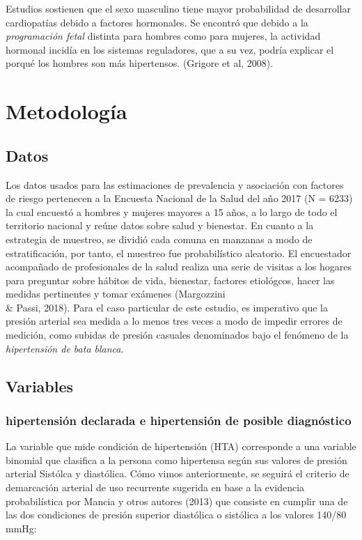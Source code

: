 \documentclass{aa}
\begin{document}
Estudios sostienen que el sexo masculino tiene mayor probabilidad de desarrollar cardiopatías debido a factores hormonales. Se encontró que debido a la \textit{programación fetal} distinta para hombres como para mujeres, la actividad hormonal incidía en los sistemas reguladores, que a su vez, podría explicar el porqué los hombres son más hipertensos. (Grigore et al, 2008).

\section{Metodología}

\subsection{Datos}

Los datos usados para las estimaciones de prevalencia y asociación con factores de riesgo pertenecen a la Encuesta Nacional de la Salud del año 2017 (N = 6233) la cual encuestó a hombres y mujeres mayores a 15 años, a lo largo de todo el territorio nacional y reúne datos sobre salud y bienestar. En cuanto a la estrategia de muestreo, se dividió cada comuna en manzanas a modo de estratificación, por tanto, el muestreo fue probabilístico aleatorio. 
El encuestador acompañado de profesionales de la salud realiza una serie de visitas a los hogares para preguntar sobre hábitos de vida, bienestar, factores etiológcos, hacer las medidas pertinentes y tomar exámenes (Margozzini \\\& Passi, 2018). Para el caso particular de este estudio, es imperativo que la presión arterial sea medida a lo menos tres veces a modo de impedir errores de medición, como subidas de presión casuales denominados bajo el fenómeno de la \textit{hipertensión de bata blanca}.

 \subsection{Variables}

\subsubsection{hipertensión declarada e hipertensión de posible diagnóstico}

La variable que mide condición de hipertensión (HTA) corresponde a una variable binomial que clasifica a la persona como hipertensa según sus valores de presión arterial Sistólca y diastólica. Cómo vimos anteriormente, se seguirá el criterio de demarcación arterial de uso recurrente sugerida en base a la evidencia probabilística por Mancia y otros autores (2013) que consiste en cumplir una de las dos condiciones de presión superior diastólica o sistólica a los valores 140/80 mmHg:
\end{document}
